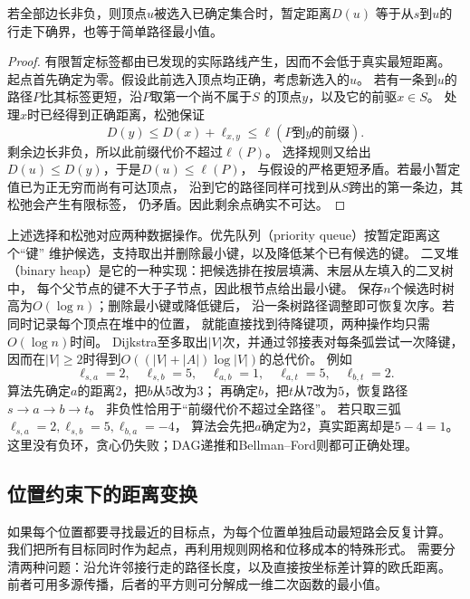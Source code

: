 \begin{theorem}[Dijkstra算法的贪心正确性]
  \label{thm:graph-theory-dijkstra-correctness}
  若全部边长非负，则顶点\(u\)被选入已确定集合时，暂定距离\(D(u)\)
  等于从\(s\)到\(u\)的行走下确界，也等于简单路径最小值。
\end{theorem}

\begin{proof}
有限暂定标签都由已发现的实际路线产生，因而不会低于真实最短距离。
起点首先确定为零。假设此前选入顶点均正确，考虑新选入的\(u\)。
若有一条到\(u\)的路径\(P\)比其标签更短，沿\(P\)取第一个尚不属于\(S\)
的顶点\(y\)，以及它的前驱\(x\in S\)。
处理\(x\)时已经得到正确距离，松弛保证
\[
  D(y)\leq D(x)+\ell_{x,y}
  \leq \ell(P\text{到}y\text{的前缀}).
\]
剩余边长非负，所以此前缀代价不超过\(\ell(P)\)。
选择规则又给出\(D(u)\leq D(y)\)，于是\(D(u)\leq\ell(P)\)，
与假设的严格更短矛盾。若最小暂定值已为正无穷而尚有可达顶点，
沿到它的路径同样可找到从\(S\)跨出的第一条边，其松弛会产生有限标签，
仍矛盾。因此剩余点确实不可达。
\end{proof}

上述选择和松弛对应两种数据操作。优先队列（priority queue）按暂定距离这个“键”
维护候选，支持取出并删除最小键，以及降低某个已有候选的键。
二叉堆（binary heap）是它的一种实现：把候选排在按层填满、末层从左填入的二叉树中，
每个父节点的键不大于子节点，因此根节点给出最小键。
保存\(n\)个候选时树高为\(O(\log n)\)；删除最小键或降低键后，
沿一条树路径调整即可恢复次序。若同时记录每个顶点在堆中的位置，
就能直接找到待降键项，两种操作均只需\(O(\log n)\)时间。
Dijkstra至多取出\(|V|\)次，并通过邻接表对每条弧尝试一次降键，
因而在\(|V|\geq2\)时得到\(O((|V|+|A|)\log|V|)\)的总代价。
例如
\[
  \ell_{s,a}=2,\quad\ell_{s,b}=5,\quad\ell_{a,b}=1,\quad
  \ell_{a,t}=5,\quad\ell_{b,t}=2.
\]
算法先确定\(a\)的距离\(2\)，把\(b\)从\(5\)改为\(3\)；
再确定\(b\)，把\(t\)从\(7\)改为\(5\)，恢复路径\(s\to a\to b\to t\)。
非负性恰用于“前缀代价不超过全路径”。
若只取三弧\(\ell_{s,a}=2,\ell_{s,b}=5,\ell_{b,a}=-4\)，
算法会先把\(a\)确定为\(2\)，真实距离却是\(5-4=1\)。
这里没有负环，贪心仍失败；DAG递推和Bellman--Ford则都可正确处理。

\subsection{位置约束下的距离变换}
\label{sec:graph-distance-transforms}

如果每个位置都要寻找最近的目标点，为每个位置单独启动最短路会反复计算。
我们把所有目标同时作为起点，再利用规则网格和位移成本的特殊形式。
需要分清两种问题：沿允许邻接行走的路径长度，以及直接按坐标差计算的欧氏距离。
前者可用多源传播，后者的平方则可分解成一维二次函数的最小值。

